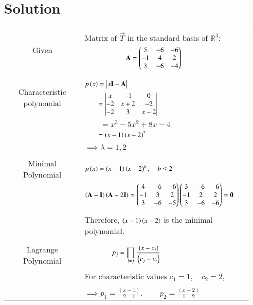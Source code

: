 \documentclass[journal,12pt]{IEEEtran}
\begin{document}
\section{\textbf{Solution}}
\renewcommand{\thetable}{2}
\begin{longtable}{|c|l|}
    \hline
    \multirow{3}{*}{Given} 
	& \\
	&Matrix of $\vec{T}$ in the standard basis of $\mathbb{R}^3:$\\
	& $\qquad\qquad\qquad\mathbf{A}=\begin{pmatrix}5&-6&-6\\-1&4&2\\3&-6&-4\end{pmatrix}$\\
	&\\
	\hline
	\multirow{3}{*}{Characteristic polynomial} 
	& \\
	& $p\brak{x}=\mydet{x\Vec{I}-\Vec{A}}$\\
	& $\qquad = \begin{vmatrix}x&-1&0\\-2&x+2&-2\\-2&3&x-2\end{vmatrix}$\\
	& $\qquad=x^3-5x^2+8x-4$\\
	&$\qquad=\left(x-1\right)\left(x-2\right)^2$\\
	&\\
	&$\implies \lambda=1, 2$\\
	&\\
	\hline
	\multirow{3}{*}{Minimal Polynomial} & \\
	& $p\left(x\right)=\left(x-1\right)\left(x-2\right)^b,\quad b\leq2$\\
	&\\
	&$\left(\mathbf{A}-\mathbf{I}\right)\left(\mathbf{A}-2\mathbf{I}\right)=\begin{pmatrix}4&-6&-6\\-1&3&2\\3&-6&-5\end{pmatrix}\begin{pmatrix}3&-6&-6\\-1&2&2\\3&-6&-6\end{pmatrix}=\mathbf{0}$\\
	&\\
	&Therefore, $\left(x-1\right)\left(x-2\right)$ is the minimal polynomial.\\
	&\\
	\hline
	\multirow{3}{*}{Lagrange Polynomial} 
	& \\
	& $\qquad\qquad p_j=\displaystyle\prod_{i\neq j} \frac{\left(x-c_i\right)}{\left(c_j-c_i\right)}$\\
	&\\
	& For characteristic values $c_1=1,\quad c_2=2$,\\
	&\\
	& $\implies p_1=\frac{(x-1)}{2-1}, \qquad p_2=\frac{(x-2)}{1-2}$\\

\end{longtable}
\end{document}
